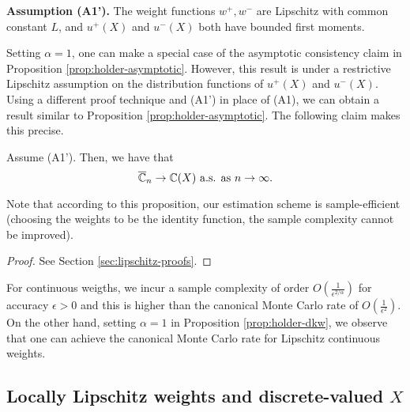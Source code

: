 \noindent\textbf{Assumption (A1').}  The weight functions $w^+, w^-$ are Lipschitz with common constant $L$, and 
$u^+(X)$ and $u^-(X)$ both have bounded first moments.

Setting $\alpha=1$, one can make a special case of the asymptotic consistency claim in Proposition \ref{prop:holder-asymptotic}. However, this result is under  a restrictive Lipschitz assumption on the distribution functions of $u^+(X)$ and $u^-(X)$. Using a different proof technique and (A1') in place of (A1), we can obtain a result similar to Proposition \ref{prop:holder-asymptotic}. The following claim makes this precise.

\begin{proposition}
\label{prop:lipschitz}
Assume (A1'). Then, we have that 
$$\overline {\mathbb{C}}_n
\rightarrow
\mathbb{C}(X)
 \text{   a.s. as } n\rightarrow \infty.
$$
\end{proposition}
Note that according to this proposition, our estimation scheme is sample-efficient (choosing the weights to be the identity function, the sample complexity cannot be improved).
\begin{proof}
See Section \ref{sec:lipschitz-proofs}.
\end{proof}

\begin{remark}
 For \holder continuous weigths, we incur a sample complexity of order $O\left(\frac1{\epsilon^{2/\alpha}}\right)$ for accuracy $\epsilon>0$ and this is higher than the canonical Monte Carlo rate of $O\left(\frac1{\epsilon^2}\right)$. On the other hand, setting $\alpha=1$ in Proposition \ref{prop:holder-dkw}, we observe that one can achieve the canonical Monte Carlo rate for Lipschitz continuous weights.
\end{remark}

\subsection{Locally Lipschitz weights and discrete-valued $X$}

